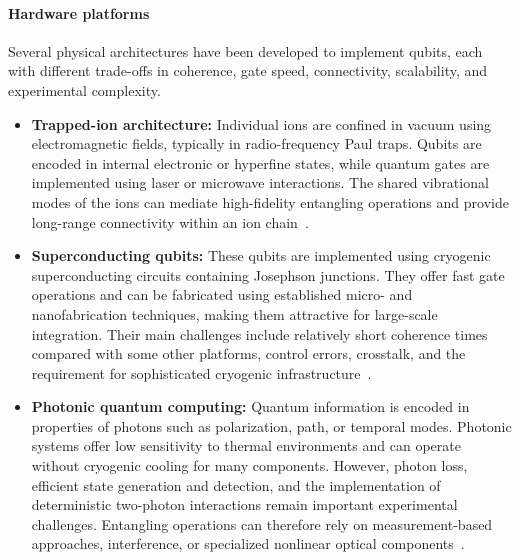 \paragraph{Hardware platforms}
Several physical architectures have been developed to implement qubits, each with different trade-offs in coherence, gate speed, connectivity, scalability, and experimental complexity.
\begin{itemize}
\item \textbf{Trapped-ion architecture:} Individual ions are confined in vacuum using electromagnetic fields, typically in radio-frequency Paul traps. Qubits are encoded in internal electronic or hyperfine states, while quantum gates are implemented using laser or microwave interactions. The shared vibrational modes of the ions can mediate high-fidelity entangling operations and provide long-range connectivity within an ion chain~\cite{trapped_ions}.

\item \textbf{Superconducting qubits:} These qubits are implemented using cryogenic superconducting circuits containing Josephson junctions. They offer fast gate operations and can be fabricated using established micro- and nanofabrication techniques, making them attractive for large-scale integration. Their main challenges include relatively short coherence times compared with some other platforms, control errors, crosstalk, and the requirement for sophisticated cryogenic infrastructure~\cite{superconductiong_qubits}.

\item \textbf{Photonic quantum computing:} Quantum information is encoded in properties of photons such as polarization, path, or temporal modes. Photonic systems offer low sensitivity to thermal environments and can operate without cryogenic cooling for many components. However, photon loss, efficient state generation and detection, and the implementation of deterministic two-photon interactions remain important experimental challenges. Entangling operations can therefore rely on measurement-based approaches, interference, or specialized nonlinear optical components~\cite{photonic_qubits}.
\end{itemize}



